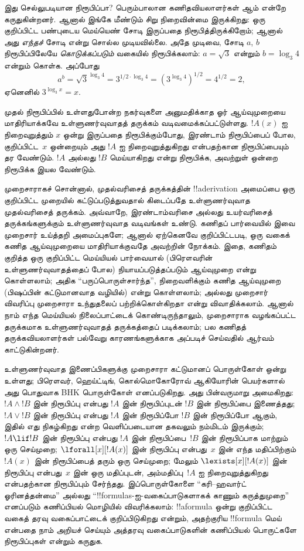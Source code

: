 \documentclass[../../../include/open-logic-section]{subfiles}
\begin{document}
இது செல்லுபடியான நிரூபிப்பா? பெரும்பாலான கணிதவியலாளர்கள் ஆம் என்றே
கருதுகின்றனர். ஆனால் இங்கே மீண்டும் சிறு நிறைவின்மை இருக்கிறது:
ஒரு குறிப்பிட்ட பண்புடைய மெய்யெண் சோடி இருப்பதை நிரூபித்திருக்கிறோம்;
ஆனால் அது \emph{எந்தச்} சோடி என்று சொல்ல முடியவில்லை. அதே முடிவை,
சோடி $a$, $b$ நிரூபிப்பிலேயே \emph{கொடுக்கப்படும்} வகையில்
நிரூபிக்கலாம்: $a = \sqrt{3}$ என்றும் $b = \log_3 4$ என்றும் கொள்க.
அப்போது
\[
a^b = \sqrt{3}^{\log_3 4} = 3^{1/2 \cdot \log_3 4} = (3^{\log_3
  4})^{1/2} = 4^{1/2}= 2,
\]
ஏனெனில் $3^{\log_3 x} = x$.

முதல் நிரூபிப்பில் உள்ளதுபோன்ற நகர்வுகளை அனுமதிக்காத ஓர் ஆய்வுமுறையை
மாதிரியாக்கவே உள்ளுணர்வுவாதத் தருக்கம் வடிவமைக்கப்பட்டுள்ளது.
$!A(x)$ ஐ நிறைவுறுத்தும் $x$ ஒன்று இருப்பதை நிரூபிக்கும்போது,
இரண்டாம் நிரூபிப்பைப் போல, குறிப்பிட்ட~$x$ ஒன்றையும் அது $!A$ ஐ
நிறைவுறுத்துகிறது என்பதற்கான நிரூபிப்பையும் தர வேண்டும். $!A$ அல்லது
$!B$ மெய்யாகிறது என்று நிரூபிக்க, அவற்றுள் ஒன்றை நிரூபிக்க இயல வேண்டும்.

முறைசாராகச் சொன்னால், முதல்வரிசைத் தருக்கத்தின் !!a{derivation}
அமைப்பை ஒரு குறிப்பிட்ட முறையில் கட்டுப்படுத்துவதால் கிடைப்பதே
உள்ளுணர்வுவாத முதல்வரிசைத் தருக்கம். அவ்வாறே, இரண்டாம்வரிசை அல்லது
உயர்வரிசைத் தருக்கங்களுக்கும் உள்ளுணர்வுவாத வடிவங்கள் உண்டு.
கணிதப் பார்வையில் இவை முறைசார் உய்த்தறி அமைப்புகளே; ஆனால் ஏற்கெனவே
குறிப்பிட்டபடி, ஒரு வகைக் கணித ஆய்வுமுறையை மாதிரியாக்குவதே அவற்றின்
நோக்கம். இதை, கணிதம் குறித்த ஒரு குறிப்பிட்ட மெய்யியல் பார்வையால்
(பிரௌவரின் உள்ளுணர்வுவாதத்தைப் போல) நியாயப்படுத்தப்படும் ஆய்வுமுறை
என்று கொள்ளலாம்; அதிக ``பருப்பொருள்சார்ந்த'', நிறைவளிக்கும் கணித
ஆய்வுமுறை (பிஷப்பின் கட்டுமானவாத வழியில்) என்று கொள்ளலாம்; அல்லது
முறைசார் விவரிப்பு முறைசாரா உந்துதலைப் பற்றிக்கொள்கிறதா என்று
விவாதிக்கலாம். ஆனால் நாம் எந்த மெய்யியல் நிலைப்பாட்டைக் கொண்டிருந்தாலும்,
முறைசாராக வழங்கப்பட்ட தருக்கமாக உள்ளுணர்வுவாதத் தருக்கத்தைப் படிக்கலாம்;
பல கணிதத் தருக்கவியலாளர்கள் பல்வேறு காரணங்களுக்காக அப்படிச் செய்வதில்
ஆர்வம் காட்டுகின்றனர்.

உள்ளுணர்வுவாத இணைப்பிகளுக்கு முறைசாரா கட்டுமானப் பொருள்கோள் ஒன்று
உள்ளது; பிரௌவர், ஹெய்ட்டிங், கொல்மொகோரோவ் ஆகியோரின் பெயர்களால் அது
பொதுவாக BHK பொருள்கோள் எனப்படுகிறது. அது பின்வருமாறு அமைகிறது:
$!A \land !B$ இன் நிரூபிப்பு என்பது $!A$ இன் நிரூபிப்புடன் $!B$ இன்
நிரூபிப்பை இணைத்தது; $!A \lor !B$ இன் நிரூபிப்பு என்பது $!A$ இன்
நிரூபிப்போ $!B$ இன் நிரூபிப்போ ஆகும், இதில் எது நிகழ்கிறது என்ற
வெளிப்படையான தகவலும் நம்மிடம் இருக்கும்; $!A \lif !B$ இன் நிரூபிப்பு
என்பது $!A$ இன் நிரூபிப்பை~$!B$ இன் நிரூபிப்பாக மாற்றும் ஒரு செய்முறை;
$\lforall[x][!A(x)]$ இன் நிரூபிப்பு என்பது~$x$ இன் எந்த மதிப்பிற்கும்
$!A(x)$ இன் நிரூபிப்பைத் தரும் ஒரு செய்முறை; மேலும்
$\lexists[x][!A(x)]$ இன் நிரூபிப்பு என்பது~$x$ இன் ஒரு மதிப்புடன்,
அம்மதிப்பு~$!A$ ஐ நிறைவுறுத்துகிறது என்பதற்கான நிரூபிப்பும் சேர்ந்தது.
இப்பொருள்கோளை ``கரி--ஹவார்ட் ஓரினத்தன்மை'' அல்லது
``!!{formula}s-ஐ-வகைப்பாடுகளாகக் காணும் கருத்துமுறை'' எனப்படும்
கணிப்பியல் மொழியில் விவரிக்கலாம்: !!a{formula} ஒன்று குறிப்பிட்ட
வகைத் தரவு வகைப்பாட்டைக் குறிப்பிடுகிறது என்றும், அதற்குரிய
!!{formula} மெய் என்பதை நாம் அறியச் செய்யும் அத்தரவு வகைப்பாடுகளின்
கணிப்பியல் பொருட்களே நிரூபிப்புகள் என்றும் கருதுக.
\end{document}
